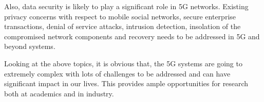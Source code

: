 \begin{multicols}{2}
Also, data security is likely to play a significant role in 5G networks. Existing privacy concerns with respect to mobile social networks, secure enterprise transactions, denial of service attacks, intrusion detection, insolation of the compromised network components and recovery needs to be addressed in 5G and beyond systems.

Looking at the above topics, it is obvious that, the 5G systems are going to extremely complex with lots of challenges to be addressed and can have significant impact in our lives. This provides ample opportunities for research both at academics and in industry.

\end{multicols}
  






